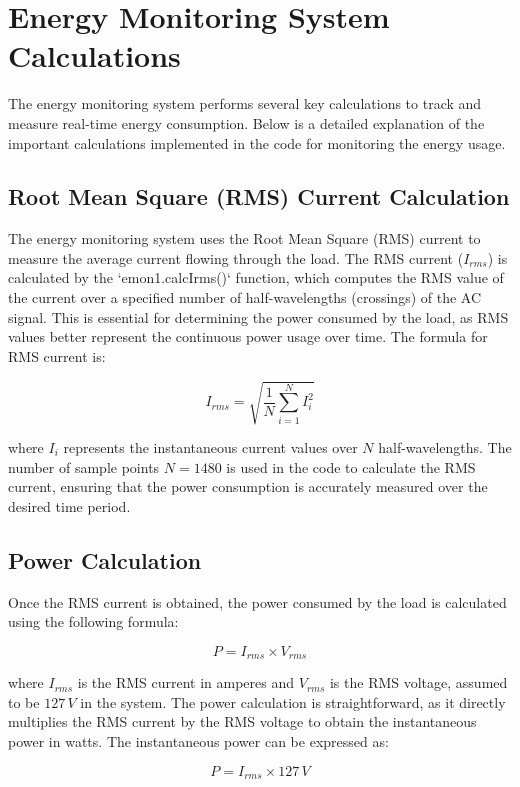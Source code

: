 \section{Energy Monitoring System Calculations}

The energy monitoring system performs several key calculations to track and measure real-time energy consumption. Below is a detailed explanation of the important calculations implemented in the code for monitoring the energy usage.

\subsection{Root Mean Square (RMS) Current Calculation}

The energy monitoring system uses the Root Mean Square (RMS) current to measure the average current flowing through the load. The RMS current (\(I_{rms}\)) is calculated by the `emon1.calcIrms()` function, which computes the RMS value of the current over a specified number of half-wavelengths (crossings) of the AC signal. This is essential for determining the power consumed by the load, as RMS values better represent the continuous power usage over time. The formula for RMS current is:

\[
I_{rms} = \sqrt{\frac{1}{N} \sum_{i=1}^{N} I_i^2}
\]

where \(I_i\) represents the instantaneous current values over \(N\) half-wavelengths. The number of sample points \(N = 1480\) is used in the code to calculate the RMS current, ensuring that the power consumption is accurately measured over the desired time period. \cite{OpenEnergyMonitor_Calibration}

\subsection{Power Calculation}

Once the RMS current is obtained, the power consumed by the load is calculated using the following formula:

\[
P = I_{rms} \times V_{rms}
\]

where \(I_{rms}\) is the RMS current in amperes and \(V_{rms}\) is the RMS voltage, assumed to be \(127 \, V\) in the system. The power calculation is straightforward, as it directly multiplies the RMS current by the RMS voltage to obtain the instantaneous power in watts. The instantaneous power can be expressed as:

\[
P = I_{rms} \times 127 \, V
\]

